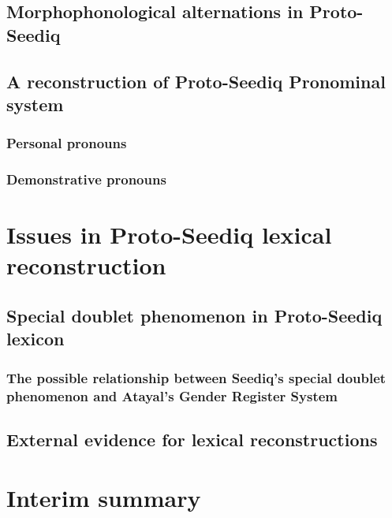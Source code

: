 \subsection{Morphophonological alternations in Proto-Seediq}
\lipsum[1]

\subsection{A reconstruction of Proto-Seediq Pronominal system}
\lipsum[1]

\subsubsection{Personal pronouns}
\lipsum[1]

\subsubsection{Demonstrative pronouns}
\lipsum[1]

\section{Issues in Proto-Seediq lexical reconstruction}
\lipsum[1]

\subsection{Special doublet phenomenon in Proto-Seediq lexicon}
\lipsum[1]

\subsubsection{The possible relationship between Seediq's special doublet phenomenon and Atayal's Gender Register System}
\lipsum[1]

\subsection{External evidence for lexical reconstructions}
\lipsum[1]

\section{Interim summary}
\lipsum[1]